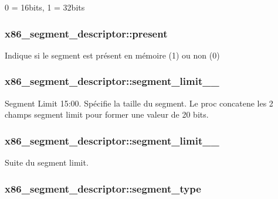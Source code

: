 0 = 16bits, 1 = 32bits \hypertarget{structx86__segment__descriptor_ad4196191d05e69b42272a411a69d1eae}{
\subsubsection[{present}]{ x86\+\_\+segment\+\_\+descriptor\+::present}}\label{structx86__segment__descriptor_ad4196191d05e69b42272a411a69d1eae}
Indique si le segment est présent en mémoire (1) ou non (0) \hypertarget{structx86__segment__descriptor_af9516f6d07c24ddedde31235b05b62c2}{
\subsubsection[{segment\+\_\+limit\+\_\+15\+\_\+0}]{ x86\+\_\+segment\+\_\+descriptor\+::segment\+\_\+limit\+\_\+\_}}\label{structx86__segment__descriptor_af9516f6d07c24ddedde31235b05b62c2}
Segment Limit 15\+:00. Spécifie la taille du segment. Le proc concatene les 2 champs segment limit pour former une valeur de 20 bits. \hypertarget{structx86__segment__descriptor_a6ab37b8f7730fe67af946725a3dd064a}{
\subsubsection[{segment\+\_\+limit\+\_\+19\+\_\+16}]{ x86\+\_\+segment\+\_\+descriptor\+::segment\+\_\+limit\+\_\+\_}}\label{structx86__segment__descriptor_a6ab37b8f7730fe67af946725a3dd064a}
Suite du segment limit. \hypertarget{structx86__segment__descriptor_ab3ef0c9fce1e74ee6549bbce5ea6f25f}{
\subsubsection[{segment\+\_\+type}]{ x86\+\_\+segment\+\_\+descriptor\+::segment\+\_\+type}}\label{structx86__segment__descriptor_ab3ef0c9fce1e74ee6549bbce5ea6f25f}
